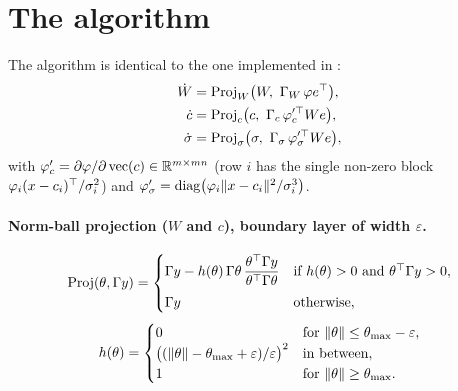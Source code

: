 \section{The algorithm}\label{sec:p1-algorithm}

The algorithm is identical to the one implemented in :
\begin{equation}\label{eq:part1:laws}
\begin{aligned}
\dot W &= \operatorname{Proj}_W\bigl(W,\ \Gamma_W\,\varphi e^\T\bigr),\\
\dot c &= \operatorname{Proj}_c\bigl(c,\ \Gamma_c\,\varphi_c'^{\T}We\bigr),\\
\dot\sigma &= \operatorname{Proj}_\sigma\bigl(\sigma,\ \Gamma_\sigma\,\varphi_\sigma'^{\T}We\bigr),
\end{aligned}
\end{equation}
with $\varphi'_c=\partial\varphi/\partial\operatorname{vec}(c)\in\mathbb{R}^{m\times mn}$ (row $i$ has the single non-zero
block $\varphi_i(x-c_i)^\top/\sigma_i^2$) and $\varphi'_\sigma=\operatorname{diag}\bigl(\varphi_i\lVert x-c_i\rVert^2/\sigma_i^3\bigr)$.

\paragraph{Norm-ball projection ($W$ and $c$), boundary layer of width $\varepsilon$.}
\begin{equation}\label{eq:part1:proj}
\operatorname{Proj}(\theta,\Gamma y)=
\begin{cases}
\Gamma y-h(\theta)\,\Gamma\theta\,\dfrac{\theta^\top\Gamma y}{\theta^\top\Gamma\theta}
  & \text{if } h(\theta)>0 \text{ and } \theta^\top\Gamma y>0,\\[8pt]
\Gamma y & \text{otherwise},
\end{cases}
\end{equation}
\begin{equation}\label{eq:part1:h}
h(\theta)=
\begin{cases}
0 & \text{for } \lVert \theta\rVert\le\theta_{\max}-\varepsilon,\\
\bigl((\lVert \theta\rVert-\theta_{\max}+\varepsilon)/\varepsilon\bigr)^2 & \text{in between},\\
1 & \text{for } \lVert \theta\rVert\ge\theta_{\max}.
\end{cases}
\end{equation}

